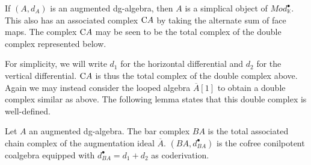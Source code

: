 \documentclass[../thesis.tex]{subfiles}
\begin{document}
            If $(A, d_A)$ is an augmented dg-algebra, then $A$ is a simplical object of $Mod_\mathbb{K}^\bullet$. This also has an associated complex $\tt{C}A$ by taking the alternate sum of face maps. The complex $\tt{C}A$ may be seen to be the total complex of the double complex represented below. 
            \begin{center}
            \end{center}
        
            For simplicity, we will write $d_1$ for the horizontal differential and $d_2$ for the vertical differential. $\tt{C}A$ is thus the total complex of the double complex above. Again we may instead consider the looped algebra $\overline{A}[1]$ to obtain a double complex similar as above. The following lemma states that this double complex is well-defined.
            
            \begin{proposition}
                Let $A$ an augmented dg-algebra. The bar complex $BA$ is the total associated chain complex of the augmentation ideal $\overline{A}$. $(BA, d_{BA}^\bullet)$ is the cofree conilpotent coalgebra equipped with $d_{BA}^\bullet = d_1 + d_2$ as coderivation.
            \end{proposition}
\end{document}
